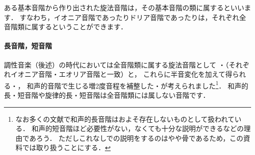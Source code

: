 \documentclass[dvipdfmx,uplatex,b5paper,openany,jbase=12Q,nomag*,textwidth-limit=44%
               ]{gachimuchi}[2020/05/05]
\begin{document}
\begin{Music}[0.95\linewidth]
  \en\doublebar%
  \Notes{}%
  \en\doublebar%
  \Notes{}%
  \en\doublebar%
  \Notes{}%
  \en\setdoublebar%
  \endpiece%
\end{Music}

ある基本音階から作り出された旋法音階は，その基本音階の類に属するといいます．
すなわち，イオニア音階であったりドリア音階であったりは，それぞれ全音階類に属するということができます．

\paragraph{長音階，短音階}
調性音楽（後述）の時代においては全音階類に属する旋法音階として
・（それぞれイオニア音階・エオリア音階と一致）と，
これらに半音変化を加えて得られる・，
和声的音階で生じる増2度音程を補整した・が考えられました\footnote{%
  なお多くの文献で和声的長音階はおよそ存在しないものとして扱われている．
  和声的短音階ほど必要性がない，なくても十分な説明ができるなどの理由であろう．
  ただしこれなしで\Gniv\Min{}の説明をするのはやや骨であるため，この資料では取り扱うことにする．
}．
和声的長・短音階や旋律的長・短音階は全音階類には属しない音階です．

\begin{Music}[0.95\linewidth]
  \nostartrule%
  \Startpiece%
  \Notes{}%
  \en\doublebar%
  \Notes{}%
  \en\doublebar%
  \Notes{}%
  \en\setdoublebar\alaligne%
  \Notes{}%
  \en\doublebar%
  \Notes{}%
  \en\doublebar%
  \Notes{}%
  \en\setdoublebar%
  \endpiece%
\end{Music}
\end{document}
